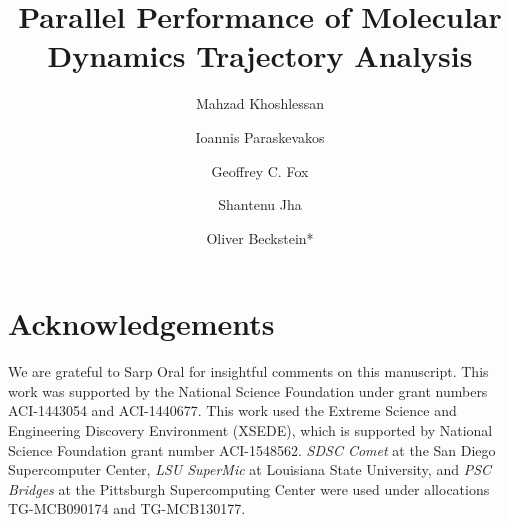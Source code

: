 \documentclass[LATO1COL]{WileyNJD-v2}
\begin{document}
\title{Parallel Performance of Molecular Dynamics Trajectory Analysis}

\author[1]{Mahzad Khoshlessan}
\author[2]{Ioannis Paraskevakos}
\author[3]{Geoffrey C. Fox}
\author[2]{Shantenu Jha}
\author[1,4]{Oliver Beckstein*}


\address[1]{, ,
  , }
\address[2]{,
  , , }
\address[3]{, ,
  , }
\address[4]{, ,
  , }

    



\maketitle













\section*{Acknowledgements}
\label{acknowledgements}
\ack



We are grateful to Sarp Oral for insightful comments on this manuscript.
This work was supported by the National Science Foundation under grant numbers ACI-1443054 and ACI-1440677.
This work used the Extreme Science and Engineering Discovery Environment (XSEDE), which is supported by National Science Foundation grant number ACI-1548562.
\emph{SDSC Comet} at the San Diego Supercomputer Center, \emph{LSU SuperMic} at Louisiana State University, and \emph{PSC Bridges} at the Pittsburgh Supercomputing Center were used under allocations TG-MCB090174 and TG-MCB130177.




\clearpage

\appendix



\end{document}
